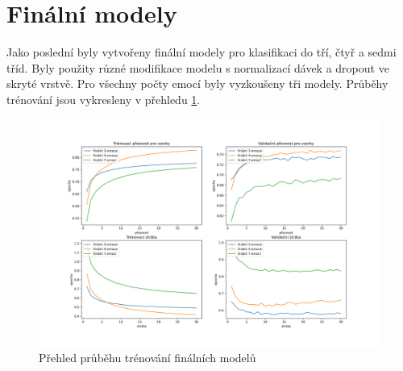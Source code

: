 \documentclass[FM,BP]{tulthesis}
\begin{document}
\begin{table}[htb]
\centering
\caption{Přehled nejlepších výsledků při použití regularizace}
\label{tab:best_results}
\end{table}
\FloatBarrier

\section{Finální modely}
Jako poslední byly vytvořeny finální modely pro klasifikaci do tří, čtyř a sedmi tříd. Byly použity různé modifikace modelu s normalizací dávek a dropout ve skryté vrstvě. Pro všechny počty emocí byly vyzkoušeny tři modely. Průběhy trénování jsou vykresleny v přehledu \mbox{\ref{fig:final_training_course}}.

\begin{figure}[!htbp]
\centerline{\includegraphics[scale=.5]{training_course-final.png}}
\caption{Přehled průběhu trénování finálních modelů}
\label{fig:final_training_course}
\end{figure}
\FloatBarrier
\end{document}
